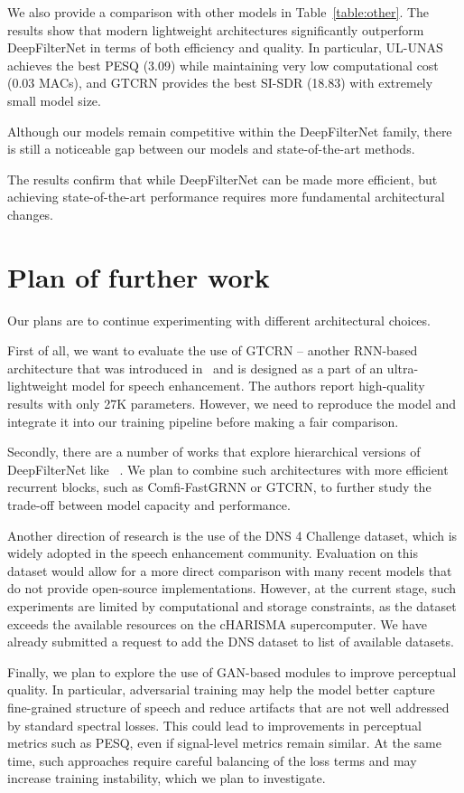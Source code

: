 \documentclass[a4paper,12pt]{extarticle}
\begin{document}
We also provide a comparison with other models in Table~\ref{table:other}. The results show that modern lightweight 
architectures significantly outperform DeepFilterNet in terms of both efficiency and quality. In particular, 
UL-UNAS achieves the best PESQ (3.09) while maintaining very low computational cost (0.03 MACs), and GTCRN 
provides the best SI-SDR (18.83) with extremely small model size.

Although our models remain competitive within the DeepFilterNet family, there is still a noticeable gap between our
models and state-of-the-art methods. 

The results confirm that while DeepFilterNet can be made more efficient, but achieving state-of-the-art
performance requires more fundamental architectural changes.



\section{Plan of further work}

Our plans are to continue experimenting with different architectural choices.

First of all, we want to evaluate the use of GTCRN -- another RNN-based architecture that was introduced in~\cite{gtcrn} and is designed as a
part of an ultra-lightweight model for speech enhancement. The authors report high-quality results with only 27K
parameters. However, we need to reproduce the model and integrate it into our training pipeline before making a fair
comparison.

Secondly, there are a number of works that explore hierarchical versions of DeepFilterNet like ~\cite{hdfnet}. We plan to combine such
architectures with more efficient recurrent blocks, such as Comfi-FastGRNN or GTCRN, to further study the trade-off
between model capacity and performance.

Another direction of research is the use of the DNS 4 Challenge dataset, which is widely adopted in the speech
enhancement community. Evaluation on this dataset would allow for a more direct comparison with many recent models
that do not provide open-source implementations. However, at the current stage, such experiments are limited by
computational and storage constraints, as the dataset exceeds the available resources on the cHARISMA supercomputer. We
have already submitted a request to add the DNS dataset to list of available datasets.

Finally, we plan to explore the use of GAN-based modules to improve perceptual quality. In particular, adversarial
training may help the model better capture fine-grained structure of speech and reduce artifacts that are not well
addressed by standard spectral losses. This could lead to improvements in perceptual metrics such as PESQ, even if
signal-level metrics remain similar. At the same time, such approaches require careful balancing of the loss terms
and may increase training instability, which we plan to investigate.
\end{document}
